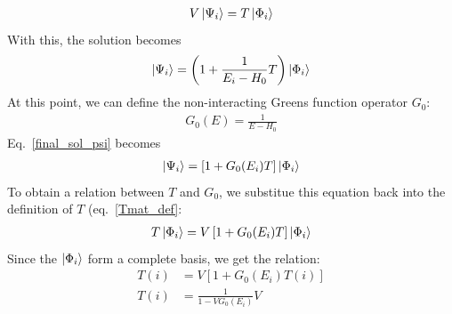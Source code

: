 \begin{equation}\begin{aligned}
	\label{Tmat_def}
	V\ket{\Psi_i} = T\ket{\Phi_i}
\end{aligned}\end{equation}
With this, the solution becomes
\begin{equation}\begin{aligned}
	\label{final_sol_psi}
	\ket{\Psi_i} = \left(1 + \frac{1}{E_i - H_0}T\right)\ket{\Phi_i}
\end{aligned}\end{equation}
At this point, we can define the non-interacting Greens function operator \(G_0\):
\begin{equation}\begin{aligned}
	G_0(E) = \frac{1}{E - H_0}
\end{aligned}\end{equation}
Eq.~\ref{final_sol_psi} becomes
\begin{equation}\begin{aligned}
	\ket{\Psi_i} = \left[1 + G_0(E_i)T\right]\ket{\Phi_i}
\end{aligned}\end{equation}
To obtain a relation between \(T\) and \(G_0\), we substitue this equation back into the definition of \(T\) (eq.~\ref{Tmat_def}:
\begin{equation}\begin{aligned}
	T\ket{\Phi_i} = V\left[1 + G_0(E_i)T\right]\ket{\Phi_i}
\end{aligned}\end{equation}
Since the \(\ket{\Phi_i}\) form a complete basis, we get the relation:
\begin{equation}\begin{aligned}
	\label{TinG}
	T(i) &= V\left[1 + G_0(E_i)T(i)\right]\\
	T(i) &= \frac{1}{1 - VG_0(E_i)}V
\end{aligned}\end{equation}

